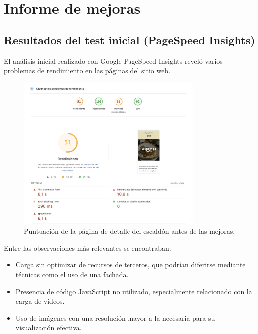 \documentclass{article}
\begin{document}
\section{Informe de mejoras}\label{sec:informe-de-mejoras}

\subsection{Resultados del test inicial (PageSpeed Insights)}\label{subsec:resultados-del-test-inicial}

El análisis inicial realizado con Google PageSpeed Insights reveló varios problemas de rendimiento en las páginas del sitio web.

\begin{figure}[h!]
    \centering
    \includegraphics[width=0.8\textwidth]{./img/p3/escaldon-performance-before}
    \caption{Puntuación de la página de detalle del escaldón antes de las mejoras.}
    \label{fig:escaldon-performance-before}
\end{figure}

Entre las observaciones más relevantes se encontraban:

\begin{itemize}
    \item Carga sin optimizar de recursos de terceros, que podrían diferirse mediante técnicas como el uso de una fachada.
    \item Presencia de código JavaScript no utilizado, especialmente relacionado con la carga de vídeos.
    \item Uso de imágenes con una resolución mayor a la necesaria para su visualización efectiva.
\end{itemize}
\end{document}
